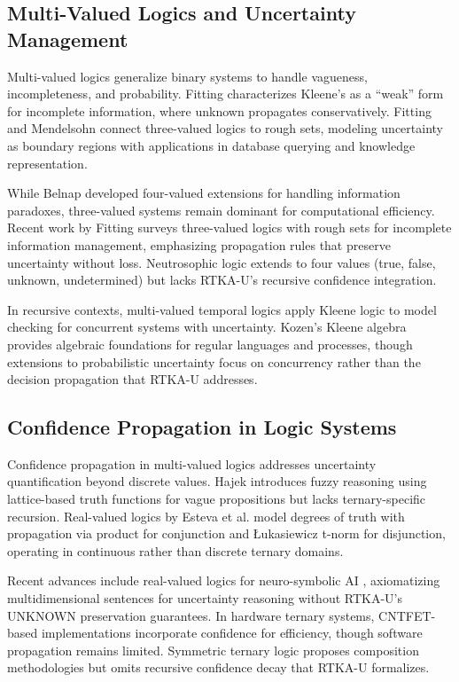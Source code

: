 \documentclass[11pt,a4paper]{article}
\begin{document}
\subsection{Multi-Valued Logics and Uncertainty Management}

Multi-valued logics generalize binary systems to handle vagueness, incompleteness, and probability. Fitting \cite{fitting1991} characterizes Kleene's as a ``weak'' form for incomplete information, where unknown propagates conservatively. Fitting and Mendelsohn \cite{fitting1998} connect three-valued logics to rough sets, modeling uncertainty as boundary regions with applications in database querying and knowledge representation.

While Belnap \cite{belnap1975} developed four-valued extensions for handling information paradoxes, three-valued systems remain dominant for computational efficiency. Recent work by Fitting \cite{fitting2023} surveys three-valued logics with rough sets for incomplete information management, emphasizing propagation rules that preserve uncertainty without loss. Neutrosophic logic \cite{smarandache2005} extends to four values (true, false, unknown, undetermined) but lacks RTKA-U's recursive confidence integration.

In recursive contexts, multi-valued temporal logics \cite{chechik2001} apply Kleene logic to model checking for concurrent systems with uncertainty. Kozen's Kleene algebra \cite{kozen1994} provides algebraic foundations for regular languages and processes, though extensions to probabilistic uncertainty \cite{kozen2013} focus on concurrency rather than the decision propagation that RTKA-U addresses.

\subsection{Confidence Propagation in Logic Systems}

Confidence propagation in multi-valued logics addresses uncertainty quantification beyond discrete values. Hajek \cite{hajek1998} introduces fuzzy reasoning using lattice-based truth functions for vague propositions but lacks ternary-specific recursion. Real-valued logics by Esteva et al. \cite{esteva2000} model degrees of truth with propagation via product for conjunction and Łukasiewicz t-norm for disjunction, operating in continuous rather than discrete ternary domains.

Recent advances include real-valued logics for neuro-symbolic AI \cite{besold2022}, axiomatizing multidimensional sentences for uncertainty reasoning without RTKA-U's UNKNOWN preservation guarantees. In hardware ternary systems, CNTFET-based implementations \cite{reza2014} incorporate confidence for efficiency, though software propagation remains limited. Symmetric ternary logic \cite{symmetric2023} proposes composition methodologies but omits recursive confidence decay that RTKA-U formalizes.
\end{document}
